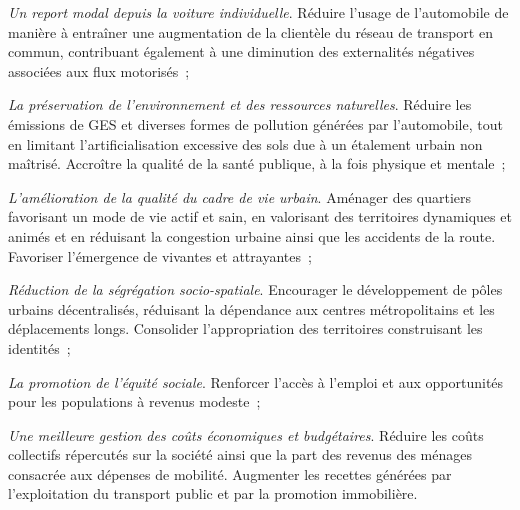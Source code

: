 \begin{refsegment}
    \begin{customitemize}
\item \textsl{Un report modal depuis la voiture individuelle}. Réduire l'usage de l'automobile de manière à entraîner une augmentation de la clientèle du réseau de transport en commun, contribuant également à une diminution des externalités négatives associées aux flux motorisés~;
\item \textsl{La préservation de l'environnement et des ressources naturelles}. Réduire les émissions de \acrfull{GES} et diverses formes de pollution générées par l'automobile, tout en limitant l'artificialisation excessive des sols due à un étalement urbain non maîtrisé. Accroître la qualité de la santé publique, à la fois physique et mentale~;
\item \textsl{L'amélioration de la qualité du cadre de vie urbain}. Aménager des quartiers favorisant un mode de vie actif et sain, en valorisant des territoires dynamiques et animés et en réduisant la congestion urbaine ainsi que les accidents de la route. Favoriser l'émergence de  vivantes et attrayantes~;
\item \textsl{Réduction de la ségrégation socio-spatiale}. Encourager le développement de pôles urbains décentralisés, réduisant la dépendance aux centres métropolitains et les déplacements longs. Consolider l'appropriation des territoires construisant les identités~;
\item \textsl{La promotion de l'équité sociale}. Renforcer l'accès à l'emploi et aux opportunités pour les populations à revenus modeste~;
\item \textsl{Une meilleure gestion des coûts économiques et budgétaires}. Réduire les coûts collectifs répercutés sur la société ainsi que la part des revenus des ménages consacrée aux dépenses de mobilité. Augmenter les recettes générées par l'exploitation du transport public et par la promotion immobilière.
    \end{customitemize}%
    

\end{refsegment}
